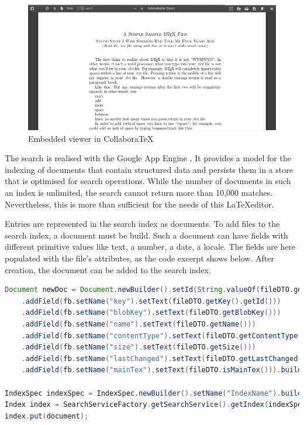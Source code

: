 \begin{figure}[H]
	\centering
		\includegraphics[width=\textwidth]{images/screenshot-pdf-viewer.png}
	\caption{Embedded  viewer in CollaboraTeX}
\end{figure}


The search is realised with the Google App Engine  \cite{website:gae-search-api}. It provides a model for the indexing of documents that contain structured data and persists them in a store that is optimised for search operations. While the number of documents in such an index is unlimited, the search cannot return more than 10,000 matches. Nevertheless, this is more than sufficient for the needs of this \LaTeX editor.

Entries are represented in the search index as documents. To add files to the search index, a document must be build. Such a document can have fields with different primitive values like text, a number, a date, a locale. The fields are here populated with the file's attributes, as the code excerpt shows below. After creation, the document can be added to the search index.

\begin{lstlisting}[language=Java, caption=Building a Document Entry for the Search Index]
Document newDoc = Document.newBuilder().setId(String.valueOf(fileDTO.getId()))
    .addField(fb.setName("key").setText(fileDTO.getKey().getId()))
    .addField(fb.setName("blobKey").setText(fileDTO.getBlobKey()))
    .addField(fb.setName("name").setText(fileDTO.getName()))
    .addField(fb.setName("contentType").setText(fileDTO.getContentType()))
    .addField(fb.setName("size").setText(fileDTO.getSize()))
    .addField(fb.setName("lastChanged").setText(fileDTO.getLastChanged()))
    .addField(fb.setName("mainTex").setText(fileDTO.isMainTex())).build();

IndexSpec indexSpec = IndexSpec.newBuilder().setName("IndexName").build();
Index index = SearchServiceFactory.getSearchService().getIndex(indexSpec);
index.put(document);
\end{lstlisting}

